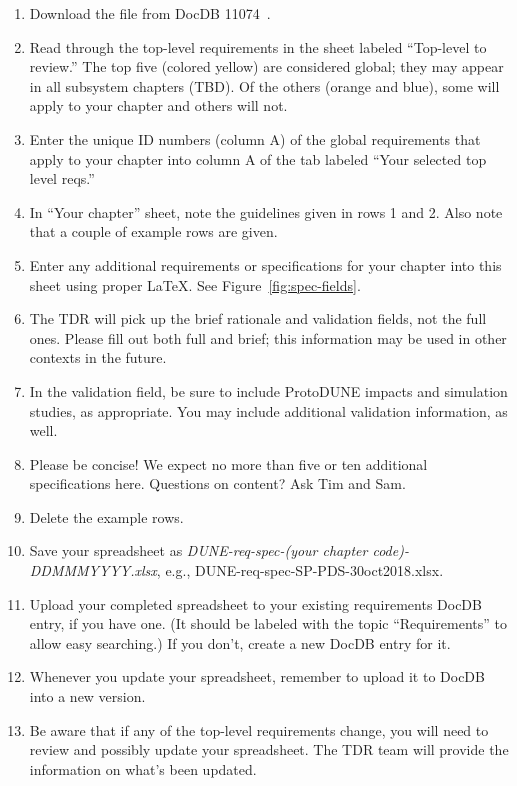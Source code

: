 \begin{enumerate}
\item Download the file from DocDB 11074~\cite{bib:docdb11074}.
\item Read through the top-level requirements in the sheet labeled ``Top-level to review.''  The top five (colored yellow) are considered global; they may appear in all subsystem chapters (TBD). Of the others (orange and blue), some will apply to your chapter and others will not.
\item Enter the unique ID numbers (column A) of the global requirements that apply to your chapter into column A of the tab labeled ``Your selected top level reqs.''
\item In ``Your chapter'' sheet, note the guidelines given in rows 1 and 2. Also note that a couple of example rows are given.
\item  Enter any additional requirements or specifications for your chapter into this sheet using proper LaTeX.  See Figure~\ref{fig:spec-fields}.
\item The TDR will pick up the brief rationale and validation fields, not the full ones. Please fill out both full and brief; this information may be used in other contexts in the future.
\item In the validation field, be sure to include ProtoDUNE impacts and simulation studies, as appropriate. You may include additional validation information, as well.  
\item Please be concise!  We expect no more than five or ten additional specifications here. Questions on content? Ask Tim and Sam.
\item Delete the example rows.
\item Save your spreadsheet as \textit{DUNE-req-spec-(your chapter code)-DDMMMYYYY.xlsx}, e.g., DUNE-req-spec-SP-PDS-30oct2018.xlsx.
\item Upload your completed spreadsheet to your existing requirements DocDB entry, if you have one. (It should be labeled with the topic ``Requirements'' to allow easy searching.) If you don't, create a new DocDB entry for it. 
\item Whenever you update your spreadsheet, remember to upload it to DocDB into a new version. 
\item Be aware that if any of the top-level requirements change, you will need to review and possibly update your spreadsheet.  The TDR team will provide the information on what's been updated.
\end{enumerate}

